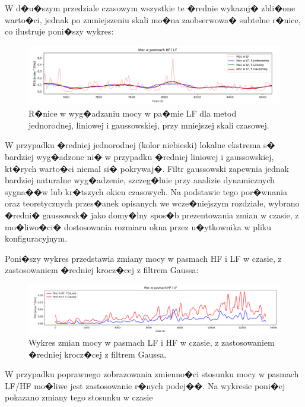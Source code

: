 W d�u�szym przedziale czasowym wszystkie te �rednie wykazuj� zbli�one warto�ci,
jednak po zmniejszeniu skali mo�na zaobserwowa� subtelne r�nice, co ilustruje
poni�szy wykres:

\begin{figure}
    \centering
    \includegraphics[scale=0.4]{Rysunki/lf_compare_avg.png}
    \caption{R�nice w wyg�adzaniu mocy w pa�mie LF dla metod jednorodnej, liniowej i gaussowskiej, przy mniejszej skali czasowej.}
    \label{fig:lf_compare_avg}
\end{figure}

W przypadku �redniej jednorodnej (kolor niebieski) lokalne ekstrema s� bardziej
wyg�adzone ni� w przypadku �redniej liniowej i gaussowskiej, kt�rych warto�ci
niemal si� pokrywaj�. Filtr gaussowski zapewnia jednak bardziej naturalne
wyg�adzenie, szczeg�lnie przy analizie dynamicznych sygna��w lub kr�tszych
okien czasowych. Na podstawie tego por�wnania oraz teoretycznych przes�anek
opisanych we wcze�niejszym rozdziale, wybrano �redni� gaussowsk� jako domy�lny
spos�b prezentowania zmian w czasie, z mo�liwo�ci� dostosowania rozmiaru okna
przez u�ytkownika w pliku konfiguracyjnym.

Poni�szy wykres przedstawia zmiany mocy w pasmach HF i LF w czasie, z
zastosowaniem �redniej krocz�cej z filtrem Gaussa:

\begin{figure}
    \centering
    \includegraphics[scale=0.4]{Rysunki/lf_hf_normal.png}
    \caption{Wykres zmian mocy w pasmach LF i HF w czasie, z zastosowaniem �redniej krocz�cej z filtrem Gaussa.}
    \label{fig:lf_hf_normal}
\end{figure}

W przypadku poprawnego zobrazowania zmienno�ci stosunku mocy w pasmach LF/HF
mo�liwe jest zastosowanie r�nych podej��. Na wykresie poni�ej pokazano zmiany
tego stosunku w czasie

